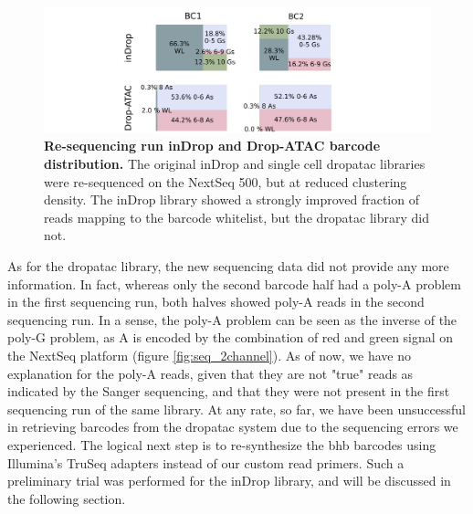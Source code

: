 \begin{figure}[ht]
\centerfloat
\includegraphics[width=\textwidth]{./ims/seq_reseq_bcdist.png}
\caption[Re-sequencing run inDrop and Drop-ATAC barcode distribution]{\textbf{Re-sequencing run inDrop and Drop-ATAC barcode distribution.} The original inDrop and single cell \acrshort{dropatac} libraries were re-sequenced on the NextSeq 500, but at reduced clustering density. The inDrop library showed a strongly improved fraction of reads mapping to the barcode whitelist, but the \acrshort{dropatac} library did not.}
\label{fig:seq_reseq_bcdist}
\end{figure}

As for the \acrshort{dropatac} library, the new sequencing data did not provide any more information. In fact, whereas only the second barcode half had a poly-A problem in the first sequencing run, both halves showed poly-A reads in the second sequencing run. In a sense, the poly-A problem can be seen as the inverse of the poly-G problem, as A is encoded by the combination of red and green signal on the NextSeq platform (figure \ref{fig:seq_2channel}). As of now, we have no explanation for the poly-A reads, given that they are not "true" reads as indicated by the Sanger sequencing, and that they were not present in the first sequencing run of the same library. At any rate, so far, we have been unsuccessful in retrieving barcodes from the \acrshort{dropatac} system due to the sequencing errors we experienced. The logical next step is to re-synthesize the \acrshort{bhb} barcodes using Illumina's TruSeq adapters instead of our custom read primers. Such a preliminary trial was performed for the inDrop library, and will be discussed in the following section.\pms


